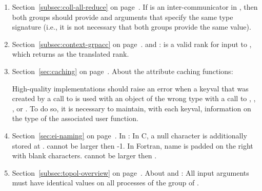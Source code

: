 \begin{enumerate}
\item
Section~\ref{subsec:coll-all-reduce} on page~\pageref{subsec:coll-all-reduce}.
\newline
If  is an inter-communicator in , then
both groups should
provide  and  arguments that specify the same type
signature
(i.e., it is not necessary that both groups provide the same  value). 

\item
Section~\ref{subsec:context-grpacc} on page~\pageref{subsec:context-grpacc}.
\newline
{} and :
 is a valid rank for input to
, which returns
 as the translated rank.

\item
Section~\ref{sec:caching} on page~\pageref{sec:caching}.
\newline
About the attribute caching functions: 
\begin{implementors}
High-quality implementations should raise an error when a keyval
%
%
%
that was created by a call to  is
used with an object of the wrong type with a call to
, , , or
. To do so, it is necessary to maintain, with
each keyval, information on the type of the associated user
function.
\end{implementors}

\item
Section~\ref{sec:ei-naming} on page~\pageref{sec:ei-naming}.
\newline
In : 
In C, a null character is additionally stored at . 
 cannot be larger then 
{}-1. 
In Fortran, name is padded on the right with blank characters. 
 cannot be larger then 
{}. 

\item
Section~\ref{subsec:topol-overview} on page~\pageref{subsec:topol-overview}.
\newline
About  and :
All input arguments must have identical values on all processes
of the group of . 


\end{enumerate}
